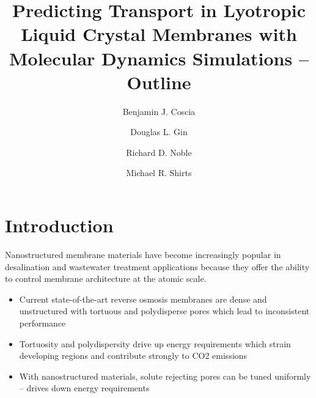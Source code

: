 \documentclass{article}
\title{Predicting Transport in Lyotropic Liquid Crystal Membranes with Molecular Dynamics Simulations -- Outline}
\author{Benjamin J. Coscia \and Douglas L. Gin \and Richard D. Noble \and Michael R. Shirts}
\begin{document}
	
	\maketitle
	\section{Introduction}
	Nanostructured membrane materials have become increasingly popular in desalination and wastewater treatment applications because they offer the ability to control membrane architecture at the atomic scale.
	\begin{itemize}
		\item Current state-of-the-art reverse osmosis membranes are dense and unstructured with tortuous and polydisperse pores which lead to inconsistent performance
		\item Tortuosity and polydispersity drive up energy requirements which strain developing regions and contribute strongly to CO2 emissions
		\item With nanostructured materials, solute rejecting pores can be tuned uniformly -- drives down energy requirements
	\end{itemize}
	
\end{document}

